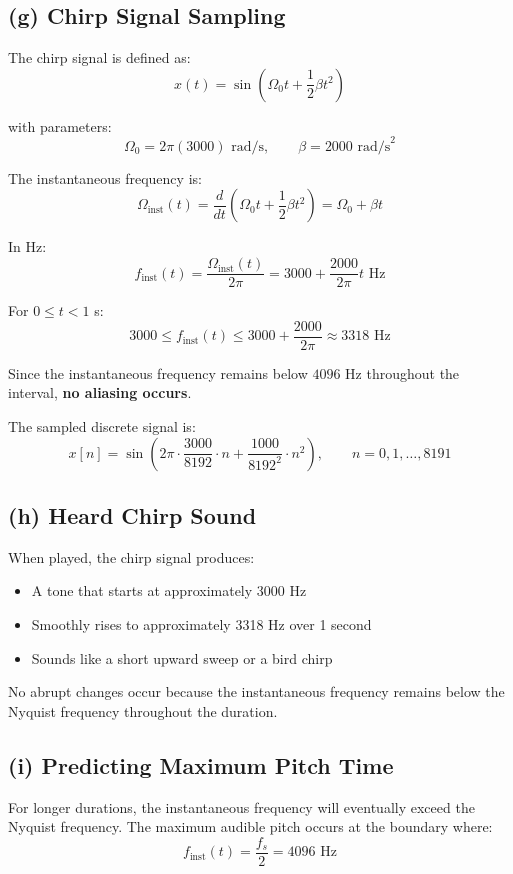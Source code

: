 \documentclass[12pt]{article}
\begin{document}
\subsection*{(g) Chirp Signal Sampling}

The chirp signal is defined as:
$$x(t) = \sin\left(\Omega_0 t + \frac{1}{2}\beta t^2\right)$$

with parameters:
$$\Omega_0 = 2\pi(3000) \text{ rad/s}, \qquad \beta = 2000 \text{ rad/s}^2$$

The instantaneous frequency is:
$$\Omega_{\text{inst}}(t) = \frac{d}{dt}\left(\Omega_0 t + \frac{1}{2}\beta t^2\right) = \Omega_0 + \beta t$$

In Hz:
$$f_{\text{inst}}(t) = \frac{\Omega_{\text{inst}}(t)}{2\pi} = 3000 + \frac{2000}{2\pi}t \text{ Hz}$$

For $0 \leq t < 1$ s:
$$3000 \leq f_{\text{inst}}(t) \leq 3000 + \frac{2000}{2\pi} \approx 3318 \text{ Hz}$$

Since the instantaneous frequency remains below $4096$ Hz throughout the interval, \textbf{no aliasing occurs}.

The sampled discrete signal is:
$$x[n] = \sin\left(2\pi \cdot \frac{3000}{8192} \cdot n + \frac{1000}{8192^2} \cdot n^2\right), \qquad n = 0, 1, \dots, 8191$$

\subsection*{(h) Heard Chirp Sound}

When played, the chirp signal produces:
\begin{itemize}
    \item A tone that starts at approximately 3000 Hz
    \item Smoothly rises to approximately 3318 Hz over 1 second
    \item Sounds like a short upward sweep or a bird chirp
\end{itemize}

No abrupt changes occur because the instantaneous frequency remains below the Nyquist frequency throughout the duration.

\subsection*{(i) Predicting Maximum Pitch Time}

For longer durations, the instantaneous frequency will eventually exceed the Nyquist frequency. The maximum audible pitch occurs at the boundary where:
$$f_{\text{inst}}(t) = \frac{f_s}{2} = 4096 \text{ Hz}$$
\end{document}
